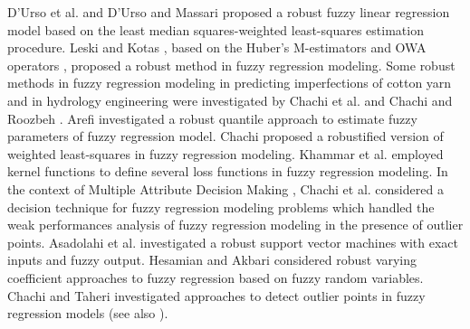 \documentclass{IJFS}
\begin{document}
D'Urso et al.  \cite{Dur11} and D'Urso and Massari  \cite{Dur13}
proposed a robust fuzzy linear regression model based on the least median squares-weighted least-squares  estimation procedure.
Leski and  Kotas \cite{Les15},
based on the Huber's M-estimators \cite{Hub09} and OWA operators \cite{Yag88}, proposed a robust method in fuzzy regression modeling.
Some robust methods in fuzzy regression modeling in predicting imperfections of cotton yarn and in  hydrology engineering were investigated by
Chachi et al. \cite{Cha14,Cha16a,Cha16b} and
Chachi and Roozbeh \cite{Cha17}.
Arefi \cite{Are19}
investigated a robust quantile approach to estimate fuzzy parameters of  fuzzy regression model.
Chachi \cite{Cha19}
proposed a robustified version of weighted least-squares in fuzzy regression modeling.
Khammar et al. \cite{Kha20,Kha21a,Kha21b}
employed kernel functions to define several loss functions in fuzzy regression modeling.
In the context of Multiple Attribute Decision Making \cite{Hwa81},
Chachi et al. \cite{Cha21c}
considered a decision technique for  fuzzy regression modeling problems  which handled the weak performances analysis of fuzzy regression modeling in the presence of
outlier points.
Asadolahi et al. \cite{Asa21}
investigated a robust support vector machines with exact inputs and fuzzy output.
Hesamian and  Akbari \cite{Hes20a,Hes20b}
considered robust varying coefficient approaches to fuzzy regression based on fuzzy random variables.
Chachi and Taheri \cite{Cha21a}
investigated approaches to detect outlier points in fuzzy regression models (see also \cite{Cha21b,Chu19}).
\end{document}
